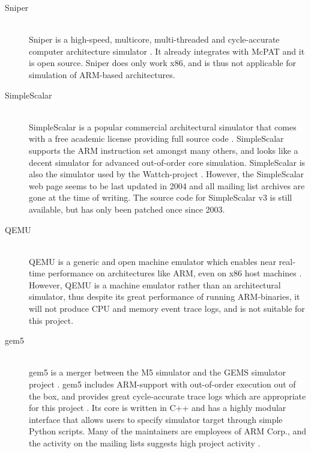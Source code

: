 \begin{description}
\item[Sniper] \hfill\\
    Sniper is a high-speed, multicore, multi-threaded and cycle-accurate
    computer architecture simulator
    \cite{sniperwebpage,carlson2011sniper,carlson2013ssomta}. It already integrates
    with McPAT and it is open source. Sniper does only work x86, and is thus not
    applicable for simulation of ARM-based architectures.

\item[SimpleScalar] \hfill\\
    SimpleScalar is a popular commercial architectural simulator that comes with
    a free academic license providing full source code
    \cite{burger1996evaluating,manjikian2001multiprocessor,austin2002simplescalar}.
    SimpleScalar supports the ARM instruction set amongst many others, and looks
    like a decent simulator for advanced out-of-order core simulation.
    SimpleScalar is also the simulator used by the Wattch-project
    \cite{brooks2000wattch}. However, the SimpleScalar web page seems to be last
    updated in 2004 and all mailing list archives are gone at the time of
    writing. The source code for SimpleScalar v3 is still available, but has
    only been patched once since 2003.

\item[QEMU]\hfill\\
    QEMU is a generic and open machine emulator which enables near real-time
    performance on architectures like ARM, even on x86 host machines
    \cite{bartholomew2006qemu,shen2010full,bellard2005qemu}. However, QEMU is a
    machine emulator rather than an architectural simulator, thus despite its great
    performance of running ARM-binaries, it will not produce CPU and memory event
    trace logs, and is not suitable for this project.

\item[gem5]\hfill\\
    gem5 is a merger between the M5 simulator \cite{binkert2006m5} and the GEMS
    simulator project \cite{GEMS}. gem5 includes ARM-support with out-of-order
    execution out of the box, and provides great cycle-accurate trace logs which
    are appropriate for this project \cite{gem5simulator}. Its core is written
    in C++ and has a highly modular interface that allows users to specify
    simulator target through simple Python scripts. Many of the maintainers are
    employees of ARM Corp., and the activity on the mailing lists suggests high
    project activity \cite{gem5dev}.
\end{description}

